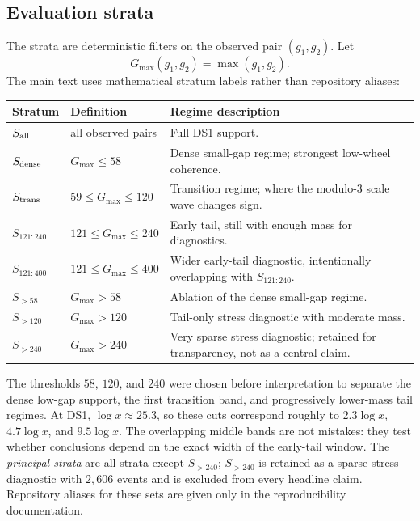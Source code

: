 \documentclass[10pt]{article}
\begin{document}
\subsection{Evaluation strata}\label{sec:strata}
The strata are deterministic filters on the observed pair $(g_1,g_2)$.  Let
\[
G_{\max}(g_1,g_2)=\max(g_1,g_2).
\]
The main text uses mathematical stratum labels rather than repository aliases:
\begin{center}\scriptsize
\begin{tabularx}{\textwidth}{>{\raggedright\arraybackslash}p{}>{\raggedright\arraybackslash}p{}>{\raggedright\arraybackslash}X}
\toprule
Stratum & Definition & Regime description \\
\midrule
$S_{\rm all}$ & all observed pairs & Full DS1 support. \\
$S_{\rm dense}$ & $G_{\max}\le58$ & Dense small-gap regime; strongest low-wheel coherence. \\
$S_{\rm trans}$ & $59\le G_{\max}\le120$ & Transition regime; where the modulo-$3$ scale wave changes sign. \\
$S_{121:240}$ & $121\le G_{\max}\le240$ & Early tail, still with enough mass for diagnostics. \\
$S_{121:400}$ & $121\le G_{\max}\le400$ & Wider early-tail diagnostic, intentionally overlapping with $S_{121:240}$. \\
$S_{>58}$ & $G_{\max}>58$ & Ablation of the dense small-gap regime. \\
$S_{>120}$ & $G_{\max}>120$ & Tail-only stress diagnostic with moderate mass. \\
$S_{>240}$ & $G_{\max}>240$ & Very sparse stress diagnostic; retained for transparency, not as a central claim. \\
\bottomrule
\end{tabularx}
\end{center}
The thresholds $58$, $120$, and $240$ were chosen before interpretation to separate the dense low-gap support, the first transition band, and progressively lower-mass tail regimes.  At DS1, $\log x\approx25.3$, so these cuts correspond roughly to $2.3\log x$, $4.7\log x$, and $9.5\log x$.  The overlapping middle bands are not mistakes: they test whether conclusions depend on the exact width of the early-tail window.  The \emph{principal strata} are all strata except $S_{>240}$; $S_{>240}$ is retained as a sparse stress diagnostic with $2{,}606$ events and is excluded from every headline claim.  Repository aliases for these sets are given only in the reproducibility documentation.
\end{document}
